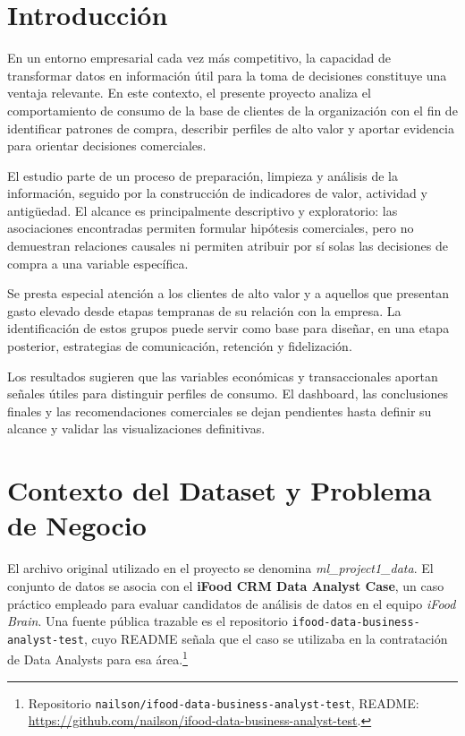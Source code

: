 \documentclass[12pt]{article}
\begin{document}
\section*{Introducción}

En un entorno empresarial cada vez más competitivo, la capacidad de transformar datos en información útil para la toma de decisiones constituye una ventaja relevante. En este contexto, el presente proyecto analiza el comportamiento de consumo de la base de clientes de la organización con el fin de identificar patrones de compra, describir perfiles de alto valor y aportar evidencia para orientar decisiones comerciales.

El estudio parte de un proceso de preparación, limpieza y análisis de la información, seguido por la construcción de indicadores de valor, actividad y antigüedad. El alcance es principalmente descriptivo y exploratorio: las asociaciones encontradas permiten formular hipótesis comerciales, pero no demuestran relaciones causales ni permiten atribuir por sí solas las decisiones de compra a una variable específica.

Se presta especial atención a los clientes de alto valor y a aquellos que presentan gasto elevado desde etapas tempranas de su relación con la empresa. La identificación de estos grupos puede servir como base para diseñar, en una etapa posterior, estrategias de comunicación, retención y fidelización.

Los resultados sugieren que las variables económicas y transaccionales aportan señales útiles para distinguir perfiles de consumo. El dashboard, las conclusiones finales y las recomendaciones comerciales se dejan pendientes hasta definir su alcance y validar las visualizaciones definitivas.

\newpage
\section*{Contexto del Dataset y Problema de Negocio}

El archivo original utilizado en el proyecto se denomina \textit{ml\_project1\_data}. El conjunto de datos se asocia con el \textbf{iFood CRM Data Analyst Case}, un caso práctico empleado para evaluar candidatos de análisis de datos en el equipo \textit{iFood Brain}. Una fuente pública trazable es el repositorio \texttt{ifood-data-business-analyst-test}, cuyo README señala que el caso se utilizaba en la contratación de Data Analysts para esa área.\footnote{Repositorio \texttt{nailson/ifood-data-business-analyst-test}, README: \url{https://github.com/nailson/ifood-data-business-analyst-test}.}
\end{document}
